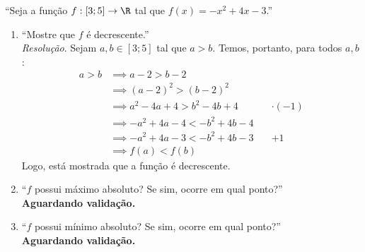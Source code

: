 \enquote{Seja a função $f: [3; 5] \rightarrow \R$ tal que $f(x) = -x^2 + 4x - 3$.}
\begin{enumerate}
    \item \enquote{Mostre que $f$ é decrescente.} \\
        \emph{Resolução}. Sejam $a, b \in [3;5]$ tal que $a > b$. Temos, portanto, para todos $a, b$:
        \begin{align*}
            a > b & \implies
            a - 2 > b - 2 \\ & \implies
            (a - 2)^2 > (b - 2)^2 \\ & \implies
            a^2 - 4a + 4 > b^2 - 4b + 4 \quad & \cdot(-1)\\ & \implies
            -a^2 + 4a - 4 < -b^2 + 4b - 4 \\ & \implies 
            -a^2 + 4a - 3 < -b^2 + 4b - 3 \quad & +1 \\ & \implies
            f(a) < f(b)
        \end{align*} 
        Logo, está mostrada que a função é decrescente.
    \item \enquote{$f$ possui máximo absoluto? Se sim, ocorre em qual ponto?} \\
    \textbf{Aguardando validação.}
    \item \enquote{$f$ possui mínimo absoluto? Se sim, ocorre em qual ponto?} \\
    \textbf{Aguardando validação.}
\end{enumerate}